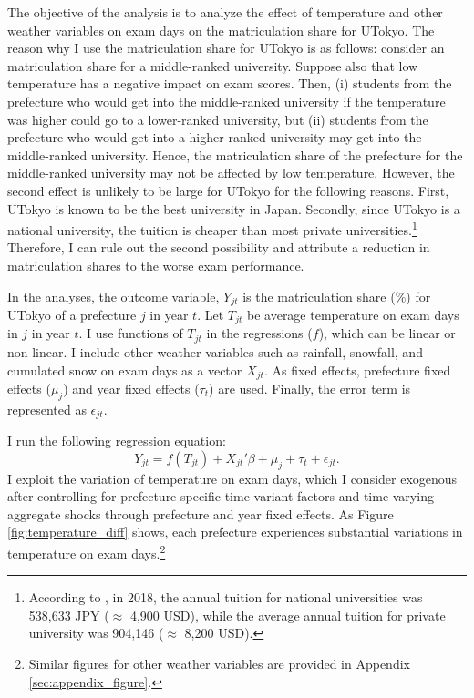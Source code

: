 \documentclass[12pt,letterpaper]{article}
\begin{document}
The objective of the analysis is to analyze the effect of temperature and other weather variables on exam days on the matriculation share for UTokyo.
The reason why I use the matriculation share for UTokyo is as follows:
consider an matriculation share for a middle-ranked university.
Suppose also that low temperature has a negative impact on exam scores.
Then, 
(i) students from the prefecture who would get into the middle-ranked university if the temperature was higher could go to a lower-ranked university, but
(ii) students from the prefecture who would get into a higher-ranked university may get into the middle-ranked university.
Hence, the matriculation share of the prefecture for the middle-ranked university may not be affected by low temperature.
However, the second effect is unlikely to be large for UTokyo for the following reasons.
First, UTokyo is known to be the best university in Japan.
Secondly, since UTokyo is a national university, the tuition is cheaper than most private universities.\footnote{
  According to \citet{mext}, in 2018, the annual tuition for national universities was 538,633 JPY ($\approx$ 4,900 USD), while the average annual tuition for private university was 904,146 ($\approx$ 8,200 USD).
}
Therefore, I can rule out the second possibility and attribute a reduction in matriculation shares to the worse exam performance.

In the analyses, the outcome variable, $Y_{jt}$ is the matriculation share (\%) for UTokyo of a prefecture $j$ in year $t$.
Let $T_{jt}$ be average temperature on exam days in $j$ in year $t$.
I use functions of $T_{jt}$ in the regressions ($f$), which can be linear or non-linear.
I include other weather variables such as rainfall, snowfall, and cumulated snow on exam days as a vector $X_{jt}$.
As fixed effects, prefecture fixed effects ($\mu_j$) and year fixed effects ($\tau_t$) are used.
Finally, the error term is represented as $\epsilon_{jt}$.

I run the following regression equation:
\begin{equation*}
  Y_{jt} = f(T_{jt}) + X_{jt}' \beta + \mu_j + \tau_t + \epsilon_{jt}.
\end{equation*}
I exploit the variation of temperature on exam days, which I consider exogenous after controlling for prefecture-specific time-variant factors and time-varying aggregate shocks through prefecture and year fixed effects.
As Figure \ref{fig:temperature_diff} shows, each prefecture experiences substantial variations in temperature on exam days.\footnote{
  Similar figures for other weather variables are provided in Appendix \ref{sec:appendix_figure}.
}
\end{document}
